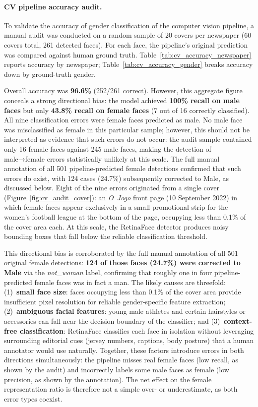 \documentclass[11pt,a4paper]{article}
\begin{document}
\paragraph{CV pipeline accuracy audit.}
\label{sec:cv_audit}
To validate the accuracy of gender classification of the computer vision pipeline, a manual audit was conducted on a random sample of 20 covers per newspaper (60 covers total, 261 detected faces). For each face, the pipeline's original prediction was compared against human ground truth. Table~\ref{tab:cv_accuracy_newspaper} reports accuracy by newspaper; Table~\ref{tab:cv_accuracy_gender} breaks accuracy down by ground-truth gender.

Overall accuracy was \textbf{96.6\%} (252/261 correct). However, this aggregate figure conceals a strong directional bias: the model achieved \textbf{100\% recall on male faces} but only \textbf{43.8\% recall on female faces} (7 out of 16 correctly classified). All nine classification errors were female faces predicted as male. No male face was misclassified as female in this particular sample; however, this should not be interpreted as evidence that such errors do not occur: the audit sample contained only 16 female faces against 245 male faces, making the detection of male→female errors statistically unlikely at this scale. The full manual annotation of all 501 pipeline-predicted female detections confirmed that such errors do exist, with 124 cases (24.7\%) subsequently corrected to Male, as discussed below. Eight of the nine errors originated from a single cover (Figure~\ref{fig:cv_audit_cover}): an \textit{O~Jogo} front page (10 September 2022) in which female faces appear exclusively in a small promotional strip for the women's football league at the bottom of the page, occupying less than 0.1\% of the cover area each. At this scale, the RetinaFace detector produces noisy bounding boxes that fall below the reliable classification threshold.

This directional bias is corroborated by the full manual annotation of all 501 original female detections: \textbf{124 of those faces (24.7\%) were corrected to Male} via the \textit{not\_woman} label, confirming that roughly one in four pipeline-predicted female faces was in fact a man. The likely causes are threefold: (1)~\textbf{small face size}: faces occupying less than 0.1\% of the cover area provide insufficient pixel resolution for reliable gender-specific feature extraction; (2)~\textbf{ambiguous facial features}: young male athletes and certain hairstyles or accessories can fall near the decision boundary of the classifier; and (3)~\textbf{context-free classification}: RetinaFace classifies each face in isolation without leveraging surrounding editorial cues (jersey numbers, captions, body posture) that a human annotator would use naturally. Together, these factors introduce errors in both directions simultaneously: the pipeline misses real female faces (low recall, as shown by the audit) and incorrectly labels some male faces as female (low precision, as shown by the annotation). The net effect on the female representation ratio is therefore not a simple over- or underestimate, as both error types coexist.
\end{document}
